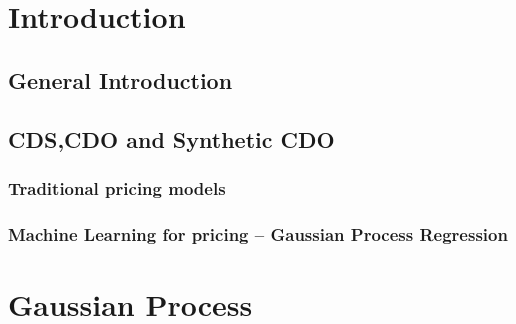 \documentclass[12pt,a4paper]{article}
\theoremstyle{definition}
\numberwithin{equation}{section}
\begin{document}
%
%

\setcounter{tocdepth}{4}

\tableofcontents %
 
\newpage %

\fancyhead{}
\fancyfoot{}
\pagestyle{fancy} 
\fancyhead[RO,LE]{\sffamily\small \thepage}
\fancyhead[LO,RE]{\sffamily\small \nouppercase{\rightmark}}
\renewcommand{\headrulewidth}{0.35pt}
\renewcommand{\footrulewidth}{0.0pt}





\section{Introduction}
\subsection{General Introduction}

\subsection{CDS,CDO and Synthetic CDO}

\subsubsection{Traditional pricing models}

\subsubsection{Machine Learning for pricing -- Gaussian Process Regression}


\newpage
\section{Gaussian Process}
\end{document}
